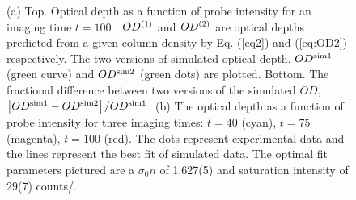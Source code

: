 \begin{figure}
\caption{(a) Top. Optical depth as a function of probe intensity for an imaging time $t=100$ \us. $OD^{\rm{(1)}}$ and $OD^{\rm{(2)}}$ are optical depths predicted from a given column density by Eq. (\ref{eq2}) and (\ref{eq:OD2}) respectively.  The two versions of simulated optical depth, $OD^{\rm{sim1}}$ (green curve) and $OD^{\rm{sim2}}$ (green dots) are plotted. Bottom. The fractional difference between two versions of the simulated $OD$, $\left|OD^{\rm{sim1}}-OD^{\rm{sim2}}\right|/OD^{\rm{sim1}}$. (b) The optical depth as a function of probe intensity for three imaging times: $t=40$ \us{} (cyan),  $t=75$ \us{} (magenta),  $t=100$ \us{} (red). The dots represent experimental data and the lines represent the best fit of simulated data. The optimal fit parameters pictured are a $\sigma_0 n$ of 1.627(5) and saturation intensity of 29(7) counts/\us{}.  }
\label{fig:compareModelsAndIsat}
\end{figure}

